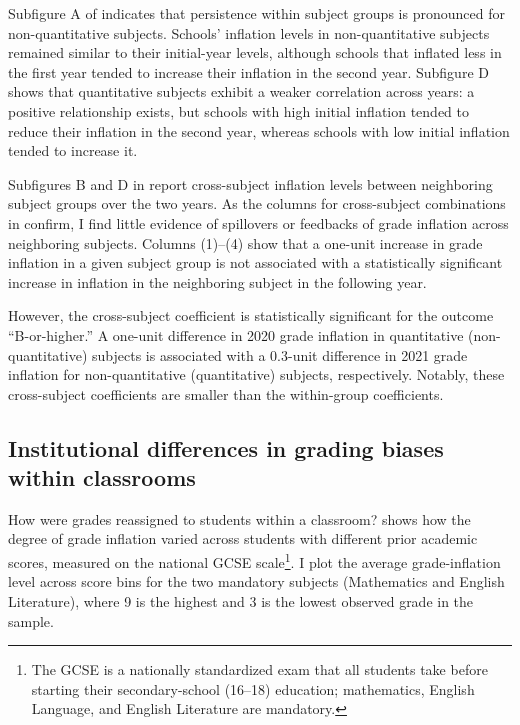 Subfigure A of  indicates that persistence within subject groups is pronounced for non-quantitative subjects. Schools' inflation levels in non-quantitative subjects remained similar to their initial-year levels, although schools that inflated less in the first year tended to increase their inflation in the second year. Subfigure D shows that quantitative subjects exhibit a weaker correlation across years: a positive relationship exists, but schools with high initial inflation tended to reduce their inflation in the second year, whereas schools with low initial inflation tended to increase it.


Subfigures B and D in  report cross-subject inflation levels between neighboring subject groups over the two years. As the columns for cross-subject combinations in  confirm, I find little evidence of spillovers or feedbacks of grade inflation across neighboring subjects. Columns (1)--(4) show that a one-unit increase in grade inflation in a given subject group is not associated with a statistically significant increase in inflation in the neighboring subject in the following year. 

However, the cross-subject coefficient is statistically significant for the outcome ``B-or-higher.'' A one-unit difference in 2020 grade inflation in quantitative (non-quantitative) subjects is associated with a 0.3-unit difference in 2021 grade inflation for non-quantitative (quantitative) subjects, respectively. Notably, these cross-subject coefficients are smaller than the within-group coefficients.

\subsection{Institutional differences in grading biases within classrooms}
How were grades reassigned to students within a classroom?  shows how the degree of grade inflation varied across students with different prior academic scores, measured on the national GCSE scale\footnote{The GCSE is a nationally standardized exam that all students take before starting their secondary-school (16–18) education; mathematics, English Language, and English Literature are mandatory.}. I plot the average grade-inflation level across score bins for the two mandatory subjects (Mathematics and English Literature), where 9 is the highest and 3 is the lowest observed grade in the sample.

